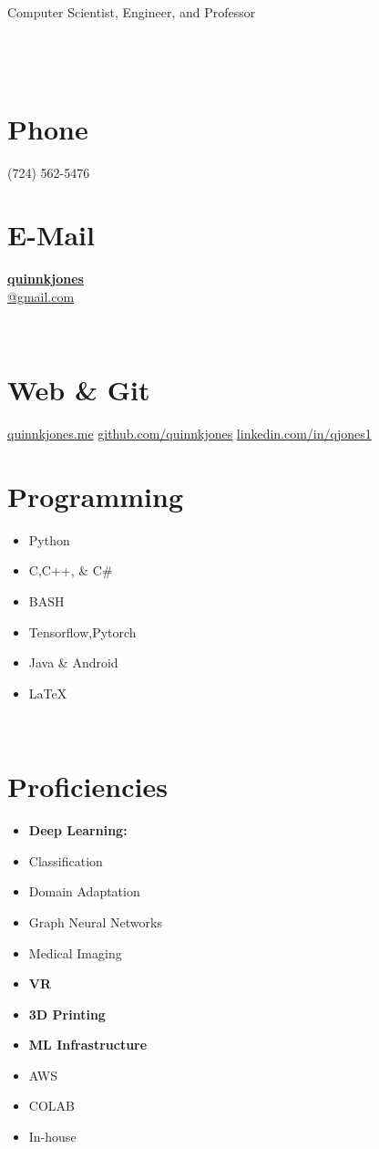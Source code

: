 \documentclass[]{friggeri-cv}
\begin{document}
      {Computer Scientist, Engineer, and Professor}
      {}
      

\begin{aside}
\section{}%
    ~
    ~
    ~
    ~
    ~
  \section{Phone}
    (724) 562-5476
    ~
  \section{E-Mail}
    \href{mailto:quinnkjones@gmail.com}{\textbf{quinnkjones}\\@gmail.com}

    ~
  \section{Web \& Git}
    \href{http://quinnkjones.me}{quinnkjones.me}
    \href{https://github.com/quinnkjones}{github.com/quinnkjones}
    \href{http://www.linkedin.com/in/qjones1}{linkedin.com/in/qjones1}
    ~
  \section{Programming}
    \begin{itemize}
        \item Python
        \item C,C++, \& C\#
        \item BASH
        \item Tensorflow,Pytorch
        \item Java \& Android
        \item \LaTeX
    \end{itemize}
    ~
  \section{Proficiencies}
    \begin{itemize}
        \item \textbf{Deep Learning:}
        \item Classification
        \item Domain Adaptation
        \item Graph Neural Networks
        \item Medical Imaging
        \item \textbf{VR}
        \item \textbf{3D Printing}
        \item \textbf{ML Infrastructure}
        \item AWS 
        \item COLAB
        \item In-house
        

\end{itemize}
\end{aside}
\end{document}
